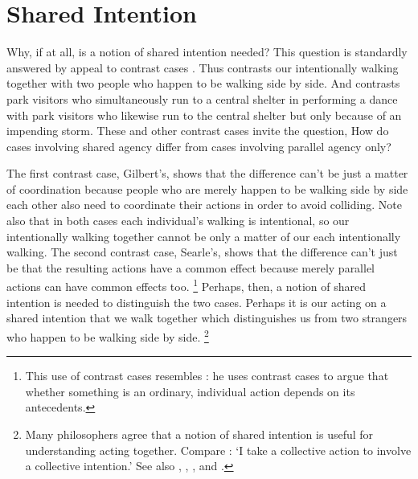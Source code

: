 \documentclass[12pt,\papersize]{extarticle}
\begin{document}
\setlength\footnotesep{1em}


\maketitle
\title{}

\begin{abstract}
\noindent
***

\end{abstract}

\section{Shared Intention}
Why, if at all, is a notion of shared intention needed? 
This question is standardly answered by appeal to contrast cases \citep[compare][p.\ 150]{Bratman:2009lv}.
Thus \citet{gilbert_walking_1990} contrasts our intentionally walking together with two people who happen to be walking side by side. 
And \citet{Searle:1990em} contrasts park visitors who  simultaneously run to a central shelter in performing a dance with park visitors who likewise run to the central shelter but only because of an impending storm.
These and other contrast cases invite the question, 
How do cases involving shared agency differ from cases involving parallel agency only? 

The first contrast case, Gilbert's, shows that the difference can’t be just  a matter of coordination because people who are merely happen to be walking side by side each other also need to coordinate their actions in order to avoid colliding.  
Note also that in both cases each individual's walking is intentional, so our intentionally walking together cannot be  only a matter of our each intentionally walking.
The second contrast case, Searle's, shows that the difference can’t just be that the resulting actions have a common effect because merely parallel actions can have common effects too.%
\footnote{
This use of contrast cases resembles \citet{Pears:1971fk}: he uses contrast cases to argue that whether something is an ordinary, individual action depends on its antecedents. 
} 
Perhaps, then, a notion of shared intention is needed to distinguish the two cases.  
Perhaps it is our acting on a shared intention that we walk together which distinguishes us from two strangers who happen to be walking side by side.%
\footnote{
Many philosophers agree that a notion of shared intention is useful for understanding acting together. 
Compare \citet[p.\ 5]{Gilbert:2006wr}: `I take a collective action to involve a collective intention.'  See also  
	\citet[p.\ 381]{Carpenter:2009wq}, 
	\citet[p.\ 369]{Call:2009fk}, 
	\citet{Kutz:2000si}, 
	\citet[p.\ 117]{rakoczy_pretend_2006} and 
	\citet{Tollefsen:2005vh}.
	}
	
\end{document}
